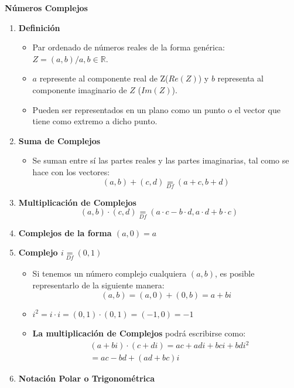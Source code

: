 \documentclass[12pt, twocolumn]{article}
\begin{document}
\textbf{\Large Números Complejos}
\begin{enumerate}
    \item \textbf{Definición}
        \begin{itemize}
            \item Par ordenado de números reales de la forma genérica: $\boxed{Z=(a,b)/a,b\in\mathbb{R}}$.
            \item $a$ represente al componente real de Z($Re(Z)$) y $b$ representa al componente imaginario de $Z$ ($Im(Z)$).
            \item Pueden ser representados en un plano como un punto o el vector que tiene como extremo a dicho punto.
        \end{itemize}
    \item \textbf{Suma de Complejos}
        \begin{itemize}
            \item Se suman entre sí las partes reales y las partes imaginarias, tal como se hace con los vectores:
                $$ \boxed{(a,b) + (c,d)\underset{Df}{=}(a+c,b+d) }$$
        \end{itemize}
    \item \textbf{Multiplicación de Complejos} 
        $$\boxed{(a,b)\cdot(c,d) \underset{Df}{=} (a\cdot c-b\cdot d,a\cdot d + b\cdot c)}$$
    \item \textbf{Complejos de la forma $(a,0)=a$}
    \item \textbf{Complejo $\boxed{i\underset{Df}{=}(0,1)}$}
        \begin{itemize}
            \item Si tenemos un número complejo cualquiera $(a,b)$, es posible representarlo de la siguiente manera:
                $$(a,b)=(a,0)+(0,b)=\boxed{a+bi}$$
            \item $i^{2}=i\cdot i = (0,1)\cdot (0,1) = (-1,0) = -1 $
            \item \textbf{La multiplicación de Complejos} podrá escribirse como:
                \begin{equation*}
                    \begin{aligned}
        & (a+bi)\cdot (c+di) = ac+adi + bci + bdi^{2}\\
        & =\boxed{ac-bd+(ad+bc)i}
                    \end{aligned}
                \end{equation*}
        \end{itemize}
    \item \textbf{Notación Polar o Trigonométrica}

\end{enumerate}
\end{document}
